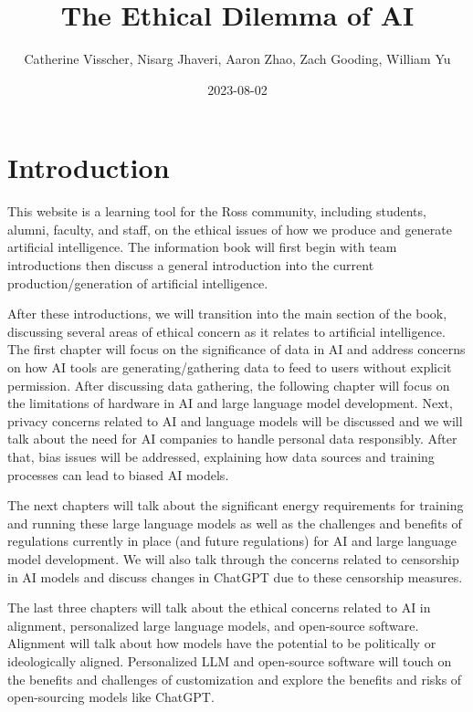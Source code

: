 \documentclass[
]{book}
\title{The Ethical Dilemma of AI}
\author{Catherine Visscher, Nisarg Jhaveri, Aaron Zhao, Zach Gooding, William Yu}
\date{2023-08-02}
\begin{document}
\maketitle

{
\setcounter{tocdepth}{1}
\tableofcontents
}
\hypertarget{introduction}{%
\chapter{Introduction}\label{introduction}}

This website is a learning tool for the Ross community, including students, alumni, faculty, and staff, on the ethical issues of how we produce and generate artificial intelligence. The information book will first begin with team introductions then discuss a general introduction into the current production/generation of artificial intelligence.

After these introductions, we will transition into the main section of the book, discussing several areas of ethical concern as it relates to artificial intelligence. The first chapter will focus on the significance of data in AI and address concerns on how AI tools are generating/gathering data to feed to users without explicit permission. After discussing data gathering, the following chapter will focus on the limitations of hardware in AI and large language model development. Next, privacy concerns related to AI and language models will be discussed and we will talk about the need for AI companies to handle personal data responsibly. After that, bias issues will be addressed, explaining how data sources and training processes can lead to biased AI models.

The next chapters will talk about the significant energy requirements for training and running these large language models as well as the challenges and benefits of regulations currently in place (and future regulations) for AI and large language model development. We will also talk through the concerns related to censorship in AI models and discuss changes in ChatGPT due to these censorship measures.

The last three chapters will talk about the ethical concerns related to AI in alignment, personalized large language models, and open-source software. Alignment will talk about how models have the potential to be politically or ideologically aligned. Personalized LLM and open-source software will touch on the benefits and challenges of customization and explore the benefits and risks of open-sourcing models like ChatGPT.
\end{document}
